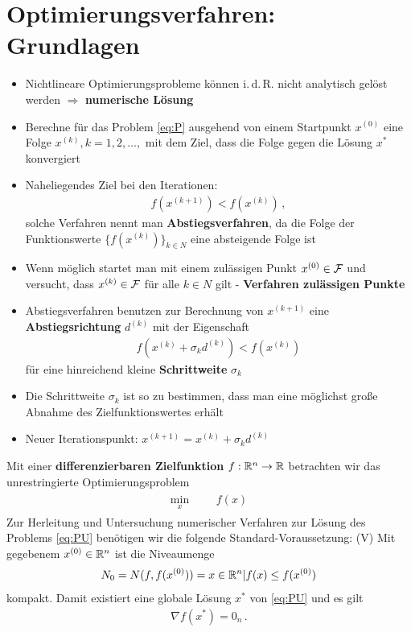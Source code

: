 \chapter{Optimierungsverfahren: Grundlagen}
\begin{itemize}
\item Nichtlineare Optimierungsprobleme können i.\,d.\,R. nicht analytisch gelöst werden $\Rightarrow$ \textbf{numerische Lösung}
\item Berechne für das Problem \eqref{eq:P} ausgehend von einem Startpunkt $x^{(0)}$ eine Folge ${x^{(k)}}, k = 1, 2,\ldots, $ mit dem Ziel, dass die Folge gegen die Lösung $x^*$ konvergiert
\item Naheliegendes Ziel bei den Iterationen:
\begin{align*}
f(x^{(k+1)}) < f (x^{(k)}) \,,
\end{align*}
solche Verfahren nennt man \textbf{Abstiegsverfahren}, da die Folge der Funktionswerte $\lbrace f(x^{(k)})\rbrace_{k \in N}$ eine absteigende Folge ist
\item Wenn möglich startet man mit einem zulässigen Punkt $x^{(0)} \in \mathcal{F}$ und versucht, dass $x^{(k)} \in \mathcal{F}$ für alle $k \in N$ gilt - \textbf{Verfahren zulässigen Punkte}
\item Abstiegsverfahren benutzen zur Berechnung von $x^{(k+1)}$ eine \textbf{Abstiegsrichtung} $d^{(k)}$ mit der Eigenschaft
\begin{align*}
f(x^{(k)} + \sigma_k d^{(k)}) < f(x^{(k)})
\end{align*}
für eine hinreichend kleine \textbf{Schrittweite} $\sigma_k$
\item Die Schrittweite $\sigma_k$ ist so zu bestimmen, dass man eine möglichst große Abnahme des Zielfunktionswertes erhält
\item Neuer Iterationspunkt: $x^{(k+1)} = x^{(k)} + \sigma_k d^{(k)}$
\end{itemize}

Mit einer \textbf{differenzierbaren Zielfunktion} $f: \mathbb R^n \rightarrow \mathbb R$ betrachten wir das unrestringierte Optimierungsproblem
	\begin{gather*} 
	\label{eq:PU}
  		\tag{PU}
  			\begin{aligned}
    			\min_x
    			& & & f(x)
  			\end{aligned}
	\end{gather*}
Zur Herleitung und Untersuchung numerischer Verfahren zur Lösung des Problems \eqref{eq:PU} benötigen wir die folgende Standard-Voraussetzung:
(V) Mit gegebenem $x^{(0)} \in \mathbb R^n$ ist die Niveaumenge
\begin{align*}
N_0 = N (f, f(x^{(0)})) = {x \in \mathbb R^n | f (x)  \leq f(x^{(0)})}
\end{align*}
kompakt.
Damit existiert eine globale Lösung $x^*$ von \eqref{eq:PU} und es gilt 
\begin{align*}
\nabla f(x^* ) = 0_n \,.
\end{align*}

